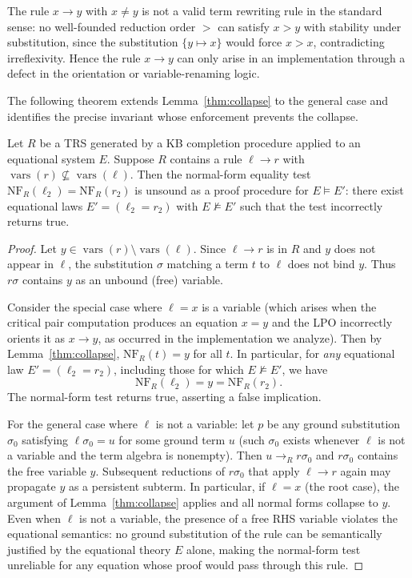 \begin{remark}
The rule $x \to y$ with $x \neq y$ is not a valid term rewriting rule in the
standard sense: no well-founded reduction order $>$ can satisfy $x > y$ with
stability under substitution, since the substitution $\{y \mapsto x\}$ would force
$x > x$, contradicting irreflexivity.  Hence the rule $x \to y$ can only arise in
an implementation through a defect in the orientation or variable-renaming logic.
\end{remark}

The following theorem extends Lemma~\ref{thm:collapse} to the general case and
identifies the precise invariant whose enforcement prevents the collapse.

\begin{theorem}\label{thm:invariant}
Let $R$ be a TRS generated by a KB completion procedure applied to an equational
system $E$.  Suppose $R$ contains a rule $\ell \to r$ with
$\operatorname{vars}(r) \not\subseteq \operatorname{vars}(\ell)$.  Then the normal-form equality test
$\mathrm{NF}_R(\ell_2) = \mathrm{NF}_R(r_2)$ is unsound as a proof procedure for
$E \models E'$: there exist equational laws $E' = (\ell_2 = r_2)$ with
$E \not\models E'$ such that the test incorrectly returns true.
\end{theorem}

\begin{proof}
Let $y \in \operatorname{vars}(r) \setminus \operatorname{vars}(\ell)$.  Since $\ell \to r$ is in $R$ and $y$
does not appear in $\ell$, the substitution $\sigma$ matching a term $t$ to $\ell$
does not bind $y$.  Thus $r\sigma$ contains $y$ as an unbound (free) variable.

Consider the special case where $\ell = x$ is a variable (which arises when the
critical pair computation produces an equation $x = y$ and the LPO incorrectly
orients it as $x \to y$, as occurred in the implementation we analyze).  Then by
Lemma~\ref{thm:collapse}, $\mathrm{NF}_R(t) = y$ for all $t$.  In particular,
for \emph{any} equational law $E' = (\ell_2 = r_2)$, including those for which
$E \not\models E'$, we have
\[
  \mathrm{NF}_R(\ell_2) = y = \mathrm{NF}_R(r_2).
\]
The normal-form test returns true, asserting a false implication.

For the general case where $\ell$ is not a variable: let $p$ be any ground
substitution $\sigma_0$ satisfying $\ell\sigma_0 = u$ for some ground term $u$
(such $\sigma_0$ exists whenever $\ell$ is not a variable and the term algebra
is nonempty).  Then $u \to_R r\sigma_0$ and $r\sigma_0$ contains the free variable
$y$.  Subsequent reductions of $r\sigma_0$ that apply $\ell \to r$ again may
propagate $y$ as a persistent subterm.  In particular, if $\ell = x$ (the root
case), the argument of Lemma~\ref{thm:collapse} applies and all normal forms collapse
to $y$.  Even when $\ell$ is not a variable, the presence of a free RHS variable
violates the equational semantics: no ground substitution of the rule can be
semantically justified by the equational theory $E$ alone, making the normal-form
test unreliable for any equation whose proof would pass through this rule.
\end{proof}

